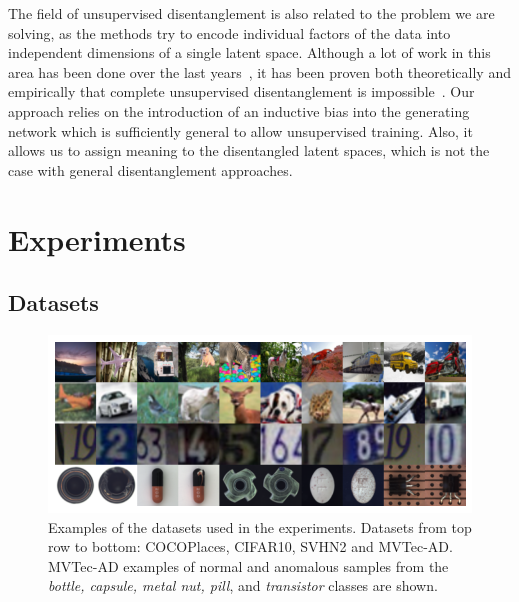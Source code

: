 The field of unsupervised disentanglement is also related to the problem we are solving, as the methods try to encode individual factors of the data into independent dimensions of a single latent space. Although a lot of work in this area has been done over the last years~\cite{burgess2018understanding, kim2018disentangling, esmaeili2019structuredhfvae, tschannen2018recent, bai2021contrastively, kim2019bayes}, it has been proven both theoretically and empirically that complete unsupervised disentanglement is impossible~\cite{locatello2019challenging, khemakhem2020variational, gabbay2021image}. Our approach relies on the introduction of an inductive bias into the generating network which is sufficiently general to allow unsupervised training. Also, it allows us to assign meaning to the disentangled latent spaces, which is not the case with general disentanglement approaches.


\section{Experiments} \label{sec:experiments}

\subsection{Datasets} \label{sec:datasets}

\begin{figure}
    \centering
    \includegraphics[width=\textwidth]{data/chapter_sgvaegan/all_grid.png}
    \caption{Examples of the datasets used in the experiments. Datasets from top row to bottom: COCOPlaces, CIFAR10, SVHN2 and MVTec-AD. MVTec-AD examples of normal and anomalous samples from the \textit{bottle, capsule, metal nut, pill}, and \textit{transistor} classes are shown.}
    \label{fig:all_grid}
\end{figure}

